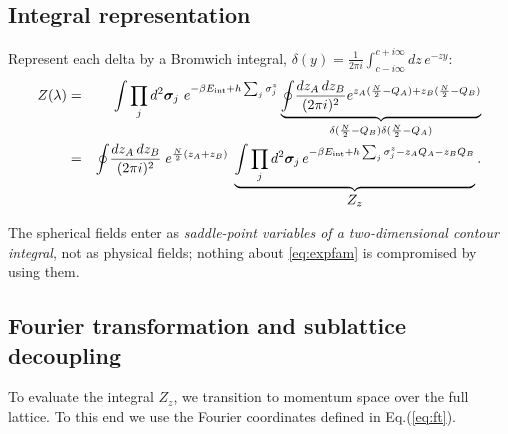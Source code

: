 \documentclass[11pt,a4paper]{article}
\begin{document}
\subsection{Integral representation}
\label{sec:integralrep}
Represent each delta by a Bromwich integral,
$\delta(y)=\frac{1}{2\pi i}\int_{c-i\infty}^{c+i\infty}dz\,e^{-zy}$:
\begin{eqnarray}
  Z(\lambda)&=& 
  \int\prod_j d^2\bm\sigma_j\ e^{-\beta E_{\rm int}+h\sum_j\sigma^z_j} \underbrace{\oint\!\frac{dz_A\,dz_B}{(2\pi i)^2}
    e^{z_A(\frac{N}{2}-Q_A)+z_B(\frac{N}{2}-Q_B)}}_{\delta(\frac{N}{2}-Q_B)\delta(\frac{N}{2}-Q_A)} \nonumber\\
  &=&\oint\!\frac{dz_A\,dz_B}{(2\pi i)^2}\;e^{\frac N2(z_A+z_B)}\;
   \underbrace{\int\prod_j d^2\bm\sigma_j\,
    e^{-\beta E_{\rm int}+h\sum_j\sigma^z_j-z_AQ_A-z_BQ_B}}_{\displaystyle Z_z} .
  \label{eq:bromwich}
\end{eqnarray}

The spherical fields enter as \emph{saddle-point variables of a two-dimensional contour
integral}, not as physical fields; nothing about \eqref{eq:expfam} is compromised by using
them.

\subsection{Fourier transformation and sublattice decoupling}
To evaluate the integral $Z_z$, we transition to momentum space over the full lattice.
To this end we use the Fourier coordinates defined in Eq.(\ref{eq:ft}).
\end{document}
